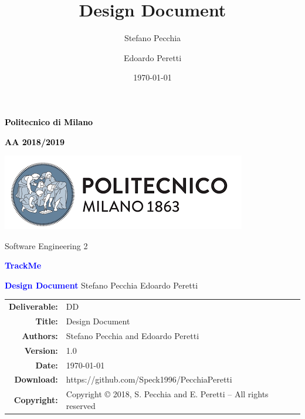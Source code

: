 \documentclass[a4paper,11pt]{report}
\title{Design Document}
\author{Stefano Pecchia \and Edoardo Peretti}
\date{\today}
\begin{document}
\begin{titlepage}
\centering

\textcolor{black}{\textbf{Politecnico di Milano}} \par
\textcolor{black}{\textbf{AA 2018/2019}} \par  \vspace{2em}
\includegraphics[scale=0.7]{resources/PolimiLogo}\par \vspace{1em}

Software Engineering 2 \par \vspace{1.5cm}
\textcolor{Blue}{\Large\textbf{TrackMe}} \par \vspace{3cm}

{\textcolor{Blue}{\textbf{\Huge{Design Document}}}} \vfill
Stefano Pecchia \hspace{5em} Edoardo Peretti \vspace{4cm}
\end{titlepage}



\begin{table}[h!]
\centering
\begin{tabular}{rl}
\hline
\textbf{Deliverable:} & DD\\
\textbf{Title:} & Design Document \\
\textbf{Authors:} & Stefano Pecchia and Edoardo Peretti\\
\textbf{Version:} & 1.0 \\ 
\textbf{Date:} & \today \\
\textbf{Download:} & https://github.com/Speck1996/PecchiaPeretti \\
\textbf{Copyright:} & Copyright © 2018, S. Pecchia and E. Peretti – All rights reserved \\
\hline
\end{tabular}
\end{table}



\tableofcontents




\end{document}
